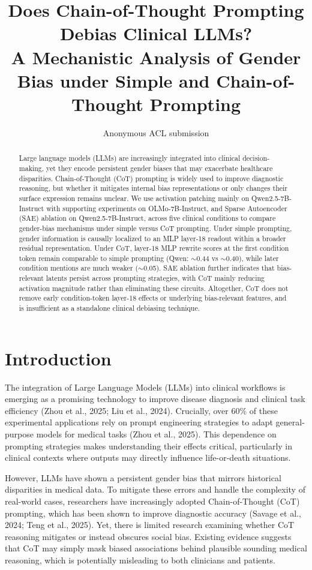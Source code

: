 \documentclass[11pt]{article}
\title{Does Chain-of-Thought Prompting Debias Clinical LLMs?\\
A Mechanistic Analysis of Gender Bias under Simple and Chain-of-Thought Prompting}
\author{Anonymous ACL submission}
\begin{document}
\maketitle

\begin{abstract}
Large language models (LLMs) are increasingly integrated into clinical decision-making, yet they encode persistent gender biases that may exacerbate healthcare disparities. Chain-of-Thought (CoT) prompting is widely used to improve diagnostic reasoning, but whether it mitigates internal bias representations or only changes their surface expression remains unclear. We use activation patching mainly on Qwen2.5-7B-Instruct with supporting experiments on OLMo-7B-Instruct, and Sparse Autoencoder (SAE) ablation on Qwen2.5-7B-Instruct, across five clinical conditions to compare gender-bias mechanisms under simple versus CoT prompting. Under simple prompting, gender information is causally localized to an MLP layer-18 readout within a broader residual representation. Under CoT, layer-18 MLP rewrite scores at the first condition token remain comparable to simple prompting (Qwen: $\sim$0.44 vs $\sim$0.40), while later condition mentions are much weaker ($\sim$0.05). SAE ablation further indicates that bias-relevant latents persist across prompting strategies, with CoT mainly reducing activation magnitude rather than eliminating these circuits. Altogether, CoT does not remove early condition-token layer-18 effects or underlying bias-relevant features, and is insufficient as a standalone clinical debiasing technique.
\end{abstract}

\section{Introduction}

The integration of Large Language Models (LLMs) into clinical workflows is emerging as a promising technology to improve disease diagnosis and clinical task efficiency (Zhou et al., 2025; Liu et al., 2024). Crucially, over 60\% of these experimental applications rely on prompt engineering strategies to adapt general-purpose models for medical tasks (Zhou et al., 2025). This dependence on prompting strategies makes understanding their effects critical, particularly in clinical contexts where outputs may directly influence life-or-death situations.

However, LLMs have shown a persistent gender bias that mirrors historical disparities in medical data. To mitigate these errors and handle the complexity of real-world cases, researchers have increasingly adopted Chain-of-Thought (CoT) prompting, which has been shown to improve diagnostic accuracy (Savage et al., 2024; Teng et al., 2025). Yet, there is limited research examining whether CoT reasoning mitigates or instead obscures social bias. Existing evidence suggests that CoT may simply mask biased associations behind plausible sounding medical reasoning, which is potentially misleading to both clinicians and patients.
\end{document}
